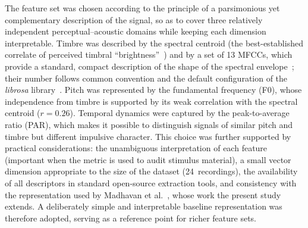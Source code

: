 \documentclass[doubleblind,preprint,12pt]{elsarticle}
\begin{document}
The feature set was chosen according to the principle of a parsimonious yet complementary description of the signal, so as to cover three relatively independent perceptual--acoustic domains while keeping each dimension interpretable. Timbre was described by the spectral centroid (the best-established correlate of perceived timbral ``brightness''~\cite{Grey1977Timbre,Lakatos2000Timbre,saitis2020brightness}) and by a set of 13 MFCCs, which provide a standard, compact description of the shape of the spectral envelope~\cite{Peeters2011TimbreToolbox,Siedenburg2017TimbreSimilarity,DeCamargo2017ProtaxSound}; their number follows common convention and the default configuration of the \textit{librosa} library~\cite{mcfee2015librosa}. Pitch was represented by the fundamental frequency (F0), whose independence from timbre is supported by its weak correlation with the spectral centroid ($r = 0.26$). Temporal dynamics were captured by the peak-to-average ratio (PAR), which makes it possible to distinguish signals of similar pitch and timbre but different impulsive character. This choice was further supported by practical considerations: the unambiguous interpretation of each feature (important when the metric is used to audit stimulus material), a small vector dimension appropriate to the size of the dataset (24~recordings), the availability of all descriptors in standard open-source extraction tools, and consistency with the representation used by Madhavan et al.~\cite{MadhavanWrobel2024MLT}, whose work the present study extends. A deliberately simple and interpretable baseline representation was therefore adopted, serving as a reference point for richer feature sets.
\end{document}
